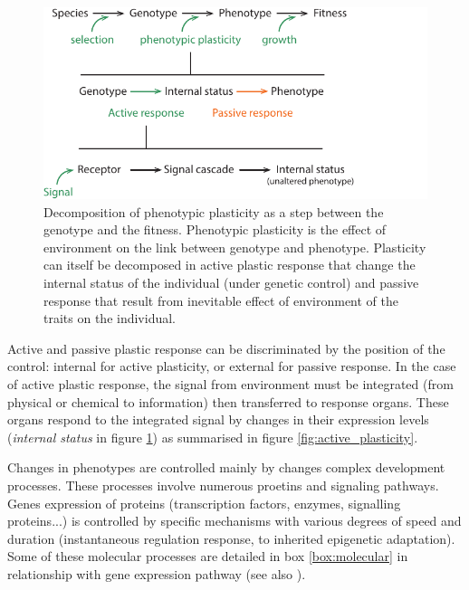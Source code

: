 \begin{figure}
    \includegraphics[width=1\linewidth]{./2_PP/Figures/Concepts/genotype_to_phenotype.pdf}
  \caption[Decomposition of plastic response]{Decomposition of phenotypic plasticity as a step between the genotype and the fitness. Phenotypic plasticity is the effect of environment on the link between genotype and phenotype. Plasticity can itself be decomposed in active plastic response that change the internal status of the individual (under genetic control) and passive response that result from inevitable effect of environment of the traits on the individual.}
  \label{fig:plasticity_form}
\end{figure}

Active and passive plastic response can be discriminated by the position of the control: internal for active plasticity, or external for passive response. In the case of active plastic response, the signal from environment must be integrated (from physical or chemical to information) then transferred to response organs. These organs respond to the integrated signal by changes in their expression levels (\textit{internal status} in figure \ref{fig:plasticity_form}) as summarised in figure \ref{fig:active_plasticity}.

Changes in phenotypes are controlled mainly by changes complex development processes. These processes involve numerous proetins and signaling pathways. Genes expression of proteins (transcription factors, enzymes, signalling proteins...) is controlled by specific mechanisms with various degrees of speed and duration (instantaneous regulation response, to inherited epigenetic adaptation). Some of these molecular processes are detailed in box \ref{box:molecular} in relationship with gene expression pathway (see also \cite{nicotra_plant_2010}).

